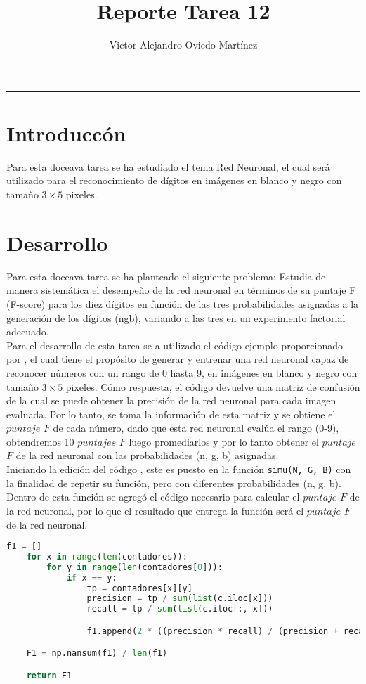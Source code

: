 \documentclass{article}
\title{Reporte Tarea 12}
\author{Victor Alejandro Oviedo Martínez}
\begin{document}
\maketitle
\hrule

\section{Introduccón}\label{intro}
Para esta doceava tarea \citep{DRA.P12} se ha estudiado el tema Red Neuronal, el cual será utilizado para el reconocimiento de dígitos en imágenes en blanco y negro con tamaño $3 \times 5 $ pixeles.

\section{Desarrollo}

Para esta doceava tarea se ha planteado el siguiente problema: Estudia de manera sistemática el desempeño de la red neuronal en términos de su puntaje F (F-score) para los diez dígitos en función de las tres probabilidades asignadas a la generación de los dígitos (ngb), variando a las tres en un experimento factorial adecuado.\\

Para el desarrollo de esta tarea se a utilizado el código ejemplo proporcionado por \citet{DRA.Code}, el cual tiene el propósito de generar y entrenar una red neuronal capaz de reconocer números con un rango de 0 hasta 9, en imágenes en blanco y negro con tamaño $3 \times 5 $ pixeles. Cómo respuesta, el código \citep{DRA.Code}  devuelve una matriz de confusión de la cual se puede obtener la precisión de la red neuronal para cada imagen evaluada. Por lo tanto, se toma la información de esta matriz y se obtiene el $puntaje$ $F$ de cada número, dado que esta red neuronal evalúa el rango (0-9), obtendremos 10 $puntajes$ $F$ luego promediarlos y por lo tanto obtener el $puntaje$ $F$ de la red neuronal con las probabilidades (n, g, b) asignadas.\\

Iniciando la edición del código \citep{DRA.Code}, este es puesto en la función \texttt{simu(N, G, B)} con la finalidad de repetir su función, pero con diferentes probabilidades (n, g, b). Dentro de esta función se agregó el código necesario para calcular el $puntaje$ $F$ de la red neuronal, por lo que el resultado que entrega la función será el $puntaje$ $F$ de la red neuronal.\\


\begin{lstlisting}[language=Python]
f1 = []
    for x in range(len(contadores)):
        for y in range(len(contadores[0])):
            if x == y:
                tp = contadores[x][y]
                precision = tp / sum(list(c.iloc[x]))
                recall = tp / sum(list(c.iloc[:, x]))

                f1.append(2 * ((precision * recall) / (precision + recall)))

    F1 = np.nansum(f1) / len(f1)

    return F1
\end{lstlisting}
\end{document}
